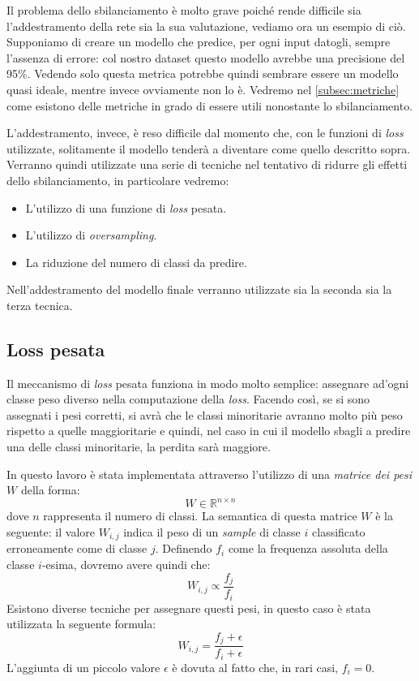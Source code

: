 Il problema dello sbilanciamento è molto grave poiché rende difficile sia l'addestramento della rete sia la sua valutazione, vediamo ora un esempio di ciò.
Supponiamo di creare un modello che predice, per ogni input datogli, sempre l'assenza di errore: col nostro dataset questo modello avrebbe una precisione del 95\%.
Vedendo solo questa metrica potrebbe quindi sembrare essere un modello quasi ideale, mentre invece ovviamente non lo è.
Vedremo nel \autoref{subsec:metriche} come esistono delle metriche in grado di essere utili nonostante lo sbilanciamento.

L'addestramento, invece, è reso difficile dal momento che, con le funzioni di \textit{loss} utilizzate, solitamente il modello tenderà a diventare come quello descritto sopra.
Verranno quindi utilizzate una serie di tecniche nel tentativo di ridurre gli effetti dello sbilanciamento, in particolare vedremo:
    \begin{itemize}
        \item L'utilizzo di una funzione di \textit{loss} pesata.
        \item L'utilizzo di \textit{oversampling}.
        \item La riduzione del numero di classi da predire. 
    \end{itemize}
Nell'addestramento del modello finale verranno utilizzate sia la seconda sia la terza tecnica.

\subsection{Loss pesata}
Il meccanismo di \textit{loss} pesata funziona in modo molto semplice: assegnare ad'ogni classe peso diverso nella computazione della \textit{loss}.
Facendo così, se si sono assegnati i pesi corretti, si avrà che le classi minoritarie avranno molto più peso rispetto a quelle maggioritarie e quindi, nel caso in cui il modello sbagli a predire una delle classi minoritarie, la perdita sarà maggiore.

In questo lavoro è stata implementata attraverso l'utilizzo di una \textit{matrice dei pesi} $W$ della forma:
    \[W \in \mathbb{R}^{n \times n}\]
dove $n$ rappresenta il numero di classi.
La semantica di questa matrice $W$ è la seguente: il valore $W_{i,j}$ indica il peso di un \textit{sample} di classe $i$ classificato erroneamente come di classe $j$. 
Definendo $f_i$ come la frequenza assoluta della classe $i$-esima, dovremo avere quindi che:
    \[W_{i,j} \propto \frac{f_j}{f_i}\]
Esistono diverse tecniche per assegnare questi pesi, in questo caso è stata utilizzata la seguente formula:
    \[W_{i,j} = \frac{f_j + \epsilon}{f_i + \epsilon}\]
L'aggiunta di un piccolo valore $\epsilon$ è dovuta al fatto che, in rari casi, $f_i = 0$.

